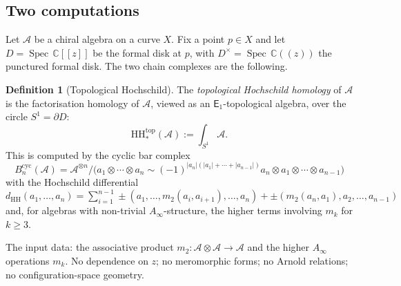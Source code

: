 \documentclass[11pt,reqno]{amsart}
\theoremstyle{definition}
\newtheorem{definition}[theorem]{Definition}
\theoremstyle{remark}
\newcommand{\cA}{\mathcal{A}}
\newcommand{\HH}{\mathrm{HH}}
\newcommand{\Ainf}{A_{\infty}}
\newcommand{\Eone}{\mathsf{E}_{1}}
\DeclareMathOperator{\Spec}{Spec}
\newcommand{\CC}{\mathbb{C}}
\numberwithin{equation}{section}
\begin{document}
\subsection{Two computations}
\label{subsec:two-computations}

Let $\cA$ be a chiral algebra on a curve $X$. Fix a point
$p \in X$ and let $D = \Spec\, \CC[[z]]$ be the formal disk
at $p$, with $D^\times = \Spec\, \CC((z))$ the punctured
formal disk. The two chain complexes are the following.

\begin{definition}[Topological Hochschild]
\label{def:top-hh}
The \emph{topological Hochschild homology} of $\cA$ is the
factorisation homology of $\cA$, viewed as an
$\Eone$-topological algebra, over the circle $S^1 = \partial D$:
\begin{equation}\label{eq:top-hh}
  \HH^{\mathrm{top}}_*(\cA)
  := \int_{S^1} \cA.
\end{equation}
This is computed by the cyclic bar complex
\begin{equation}\label{eq:cyc-bar}
  B^{\mathrm{cyc}}_n(\cA)
  = \cA^{\otimes n}
  \Big/ \bigl(a_1 \otimes \cdots \otimes a_n
  \sim (-1)^{|a_n|(|a_1| + \cdots + |a_{n-1}|)}
  a_n \otimes a_1 \otimes \cdots \otimes a_{n-1}\bigr)
\end{equation}
with the Hochschild differential
$d_{\HH}(a_1, \ldots, a_n)
= \sum_{i=1}^{n-1} \pm (a_1, \ldots,
m_2(a_i, a_{i+1}), \ldots, a_n)
+ \pm (m_2(a_n, a_1), a_2, \ldots, a_{n-1})$
and, for algebras with non-trivial $\Ainf$-structure,
the higher terms involving $m_k$ for $k \geq 3$.

The input data: the associative product
$m_2 \colon \cA \otimes \cA \to \cA$ and
the higher $\Ainf$ operations $m_k$.
No dependence on $z$; no meromorphic forms; no Arnold
relations; no configuration-space geometry.
\end{definition}
\end{document}
